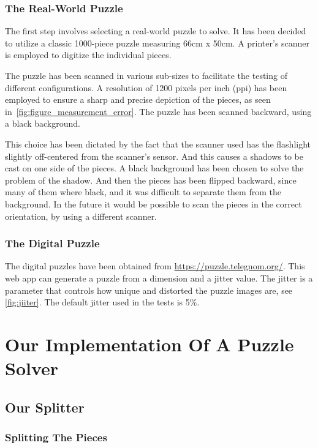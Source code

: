 \documentclass{article}
\begin{document}
\subsubsection{The Real-World Puzzle}
The first step involves selecting a real-world
puzzle to solve. It has been decided to utilize a
classic 1000-piece puzzle measuring 66cm x 50cm.
A printer's scanner is employed to digitize the individual pieces.

The puzzle has been scanned in various sub-sizes to facilitate the testing of different configurations.
A resolution of 1200 pixels per inch (ppi) has been employed to ensure a sharp and precise
depiction of the pieces, as seen in~\cref{fig:figure_measurement_error}.
The puzzle has been scanned backward, using a black background.

This choice has been dictated by the fact that the scanner used has the flashlight
slightly off-centered from the scanner's sensor.
And this causes a shadows to be cast on one side of the pieces.
A black background has been chosen to solve the problem of the shadow.
And then the pieces has been flipped backward, since many of them where black,
and it was difficult to separate them from the background.
In the future it would be possible to scan the pieces in the correct orientation,
by using a different scanner.

\subsubsection{The Digital Puzzle}
The digital puzzles have been obtained from \url{https://puzzle.telegnom.org/}.
This web app can generate a puzzle from a dimension and a jitter value. The jitter is a parameter that controls
how unique and distorted the puzzle images are, see \cref{fig:jiiter}.
The default jitter used in the tests is 5\%.

\section{Our Implementation Of A Puzzle Solver}

\subsection{Our Splitter}

\subsubsection{Splitting The Pieces}
\end{document}
